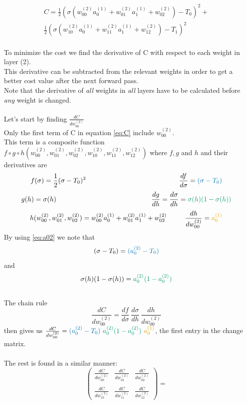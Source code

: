 \documentclass{article}
\begin{document}
\begin{equation} \label{eq:C}
\begin{aligned}
C = \frac {1}{2}(\sigma(w_{00}^{(2)}a_0^{(1)}+w_{01}^{(2)}a_1^{(1)}+w_{02}^{(2)})-T_0)^2 +
\\
\frac {1}{2}(\sigma(w_{10}^{(2)}a_0^{(1)}+w_{11}^{(2)}a_1^{(1)}+w_{12}^{(2)})-T_1)^2
\end{aligned}
\end{equation}
\\
To minimize the cost we find the derivative of C with respect to each weight in layer (2).
\\
This derivative can be subtracted from the relevant weights in order to get a better cost value after the next forward pass.
\\
Note that the derivative of \textit{all} weights in \textit{all} layers have to be calculated before \textit{any} weight is changed.
\\
\\
Let's start by finding $\frac{dC}{dw_{00}^{(2)}}$
\\
Only the first term of C in equation \eqref{eq:C} include $w_{00}^{(2)}$.
\\
This term is a composite function $f \circ g \circ h(w_{00}^{(2)}, w_{01}^{(2)}, w_{02}^{(2)}, w_{10}^{(2)}, w_{11}^{(2)},w_{12}^{(2)})$ where $f, g$ and $h$ and their derivatives are
$$f(\sigma) = \frac {1}{2}(\sigma-T_0)^2~~~~~~~~~~~~~~~~~~~~~~~~~~~~~~~~~~~~~~~~~\frac{df}{d\sigma} = \textcolor{darkblue}{(\sigma-T_0)}$$
$$g(h) = \sigma(h)~~~~~~~~~~~~~~~~~~~~~~~~~~~~~~~~~~~~~~~~~~\frac{dg}{dh} = \frac{d\sigma}{dh} = \textcolor{green}{\sigma(h)(1 - \sigma(h))}$$
$$h(w_{00}^{(2)}, w_{01}^{(2)}, w_{02}^{(2)}) = w_{00}^{(2)}a_0^{(1)}+w_{01}^{(2)}a_1^{(1)}+w_{02}^{(2)}~~~~~~~~\frac{dh}{dw_{00}^{(2)}} = \textcolor{orange}{a_0^{(1)}}$$
By using  \eqref{eq:a02} we note that $$(\sigma - T_0) = \textcolor{darkblue}{(a_0^{(2)} - T_0)}$$ and $$\sigma(h)(1-\sigma(h)) = \textcolor{green}{a_0^{(2)}(1-a_0^{(2)})}$$
\\
The chain rule $$\frac{dC}{dw_{00}^{(2)}} = \frac{df}{d\sigma}~\frac{d\sigma}{dh}~\frac{dh}{dw_{00}^{(2)}}$$
then gives us
$\frac{dC}{dw_{00}^{(2)}} = \textcolor{darkblue}{(a_0^{(2)}-T_0)}~\textcolor{green}{a_0^{(2)}(1-a_0^{(2)})}~\textcolor{orange}{a_0^{(1)}} $, the first entry in the change matrix.
\\
\\
The rest is found in a similar manner:
$$\begin{pmatrix}
\frac{dC}{dw_{00}^{(2)}} & \frac{dC}{dw_{01}^{(2)}} & \frac{dC}{dw_{02}^{(2)}}
\\\\
\frac{dC}{dw_{10}^{(2)}} & \frac{dC}{dw_{11}^{(2)}} & \frac{dC}{dw_{12}^{(2)}}
\end{pmatrix} =
$$
\end{document}
